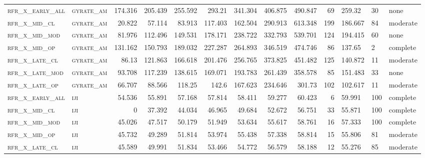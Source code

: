 \begin{landscape}
\begin{center}
\begin{footnotesize}
\begin{longtable}{llrrrrr|rrr}
\textsc{rfr\_x\_early\_all} & \textsc{gyrate\_am}   & 174.316 & 205.439 & 255.592 & 293.21   & 341.304  & 406.875  & 490.847  & 69     & 259.32        & 30            & none        \\
\textsc{rfr\_x\_mid\_cl   } & \textsc{gyrate\_am}   & 20.822  & 57.114  & 83.913  & 117.403  & 162.504  & 290.913  & 613.348  & 199    & 186.667       & 84            & moderate        \\
\textsc{rfr\_x\_mid\_mod  } & \textsc{gyrate\_am}   & 81.976  & 112.496 & 149.531 & 178.171  & 238.722  & 332.793  & 539.701  & 124    & 194.415       & 60            & none        \\
\textsc{rfr\_x\_mid\_op   } & \textsc{gyrate\_am}   & 131.162 & 150.793 & 189.032 & 227.287  & 264.893  & 346.519  & 474.746  & 86     & 137.65        & 2             & complete        \\
\textsc{rfr\_x\_late\_cl  } & \textsc{gyrate\_am}   & 86.13   & 121.863 & 166.618 & 201.476  & 256.765  & 373.825  & 451.482  & 125    & 140.872       & 11            & moderate        \\
\textsc{rfr\_x\_late\_mod } & \textsc{gyrate\_am}   & 93.708  & 117.239 & 138.615 & 169.071  & 193.783  & 261.439  & 358.578  & 85     & 151.483       & 33            & none        \\
\textsc{rfr\_x\_late\_op  } & \textsc{gyrate\_am}   & 66.707  & 88.566  & 118.25  & 142.6    & 167.623  & 234.646  & 301.73   & 102    & 102.617       & 11            & moderate        \\
\textsc{rfr\_x\_early\_all} & \textsc{iji       }   & 54.536  & 55.891  & 57.168  & 57.814   & 58.411   & 59.277   & 60.423   & 6      & 59.991        & 100           & complete        \\
\textsc{rfr\_x\_mid\_cl   } & \textsc{iji       }   & 0       & 37.392  & 44.034  & 46.965   & 49.684   & 52.672   & 56.751   & 33     & 55.871        & 100           & complete        \\
\textsc{rfr\_x\_mid\_mod  } & \textsc{iji       }   & 45.026  & 47.517  & 50.179  & 51.949   & 53.634   & 55.617   & 58.761   & 16     & 57.333        & 100           & complete        \\
\textsc{rfr\_x\_mid\_op   } & \textsc{iji       }   & 45.732  & 49.289  & 51.814  & 53.974   & 55.438   & 57.338   & 58.814   & 15     & 55.806        & 81            & moderate        \\
\textsc{rfr\_x\_late\_cl  } & \textsc{iji       }   & 45.589  & 49.991  & 51.834  & 53.466   & 54.772   & 56.579   & 58.188   & 12     & 55.276        & 85            & moderate        \\

\end{longtable}
\end{footnotesize}
\end{center}
\end{landscape}
